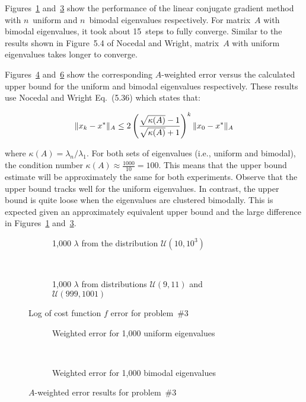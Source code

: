 Figures~\ref{fig:p03:uniformEigenvalues} and~\ref{fig:p03:bimodalEigenvalues} show the performance of the linear conjugate gradient method with $n$~uniform and $n$~bimodal eigenvalues respectively.  For matrix~$A$ with bimodal eigenvalues, it took about 15~steps to fully converge. Similar to the results shown in Figure~5.4 of Nocedal and Wright, matrix~$A$ with uniform eigenvalues takes longer to converge. 

Figures~\ref{fig:p03:uniformWeightedErr} and~\ref{fig:p03:bimodalWeightedErr} show the corresponding $A$-weighted error versus the calculated upper bound for the uniform and bimodal eigenvalues respectively.  These results use Nocedal and Wright Eq.~(5.36) which states that:

\[ \lVert x_k - x^{*}\rVert_{A} \leq 2\left(\frac{\sqrt{\kappa(A)}-1}{\sqrt{\kappa(A)}+1}\right)^{k}\lVert x_0 - x^{*}\rVert_{A} \]

\noindent
where $\kappa(A)=\lambda_n / \lambda_1$. For both sets of eigenvalues (i.e., uniform and bimodal), the condition number ${\kappa(A) \approx \frac{1000}{10} = 100}$.  This means that the upper bound estimate will be approximately the same for both experiments.  Observe that the upper bound tracks well for the uniform eigenvalues.  In contrast, the upper bound is quite loose when the eigenvalues are clustered bimodally.  This is expected given an approximately equivalent upper bound and the large difference in Figures~\ref{fig:p03:uniformEigenvalues} and~\ref{fig:p03:bimodalEigenvalues}.

\newpage
\begin{figure}[p]
  \centering
  \begin{subfigure}[t]{0.45\textwidth}
    \centering
    
    \caption{\scriptsize 1,000 $\lambda$ from the distribution $\mathcal{U}(10,10^{3})$}\label{fig:p03:uniformEigenvalues}
  \end{subfigure}
  ~
  \begin{subfigure}[t]{0.45\textwidth}
    \centering
    
    \caption{\scriptsize 1,000 $\lambda$ from distributions $\mathcal{U}(9,11)$ and $\mathcal{U}(999,1001)$ }\label{fig:p03:bimodalEigenvalues}
  \end{subfigure}
  \caption{Log of cost function $f$ error for problem~\#3}
\end{figure}

\begin{figure}[p]
  \centering
  \begin{subfigure}[t]{0.45\textwidth}
    \centering
    
    \caption{\scriptsize Weighted error for 1,000 uniform eigenvalues}\label{fig:p03:uniformWeightedErr}
  \end{subfigure}
  ~
  \begin{subfigure}[t]{0.45\textwidth}
    \centering
    
    \caption{\scriptsize Weighted error for 1,000 bimodal eigenvalues}\label{fig:p03:bimodalWeightedErr}
  \end{subfigure}
  \caption{$A$-weighted error results for problem~\#3}
\end{figure}
\clearpage